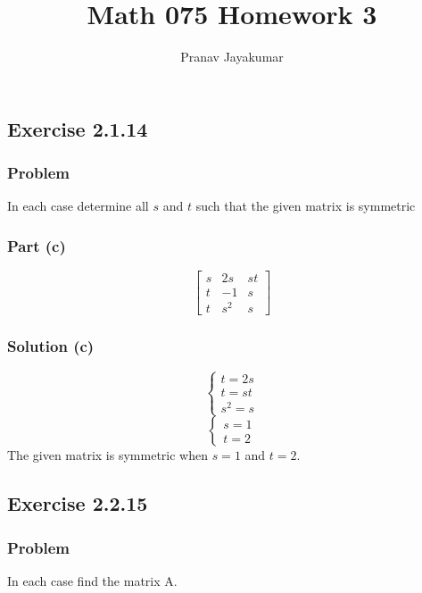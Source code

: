 \documentclass[12pt]{article}
\title{Math 075 Homework 3}
\author{Pranav Jayakumar}
\begin{document}
\maketitle

\subsection*{Exercise 2.1.14}
\vspace{0.25in}
\subsubsection*{Problem}
In each case determine all $s$ and $t$ such that the given matrix is symmetric
\subsubsection*{Part (c)}
\[
\begin{bmatrix}
    s & 2s & st\\
    t & -1 & s\\
    t & s^2 & s
\end{bmatrix}
\]
\subsubsection*{Solution (c)}
\begin{equation*}
  \begin{cases}
    t = 2s\\ 
    t = st\\ 
    s^2 = s
  \end{cases}
\end{equation*}
\begin{equation*}
  \begin{cases}
    s = 1\\ 
    t = 2 
  \end{cases}
\end{equation*}
\vspace{0.25in}
The given matrix is symmetric when $s = 1$ and $t = 2$.
\vspace{2in}
\subsection*{Exercise 2.2.15}
\vspace{0.25in}
\subsubsection*{Problem}
In each case find the matrix A. 
\end{document}
